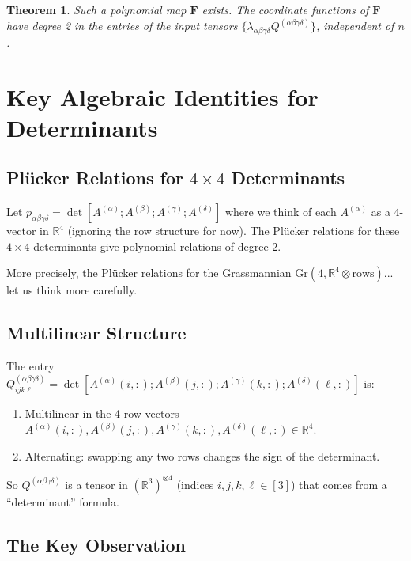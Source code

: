\documentclass[12pt]{article}
\newtheorem{theorem}{Theorem}
\theoremstyle{definition}
\begin{document}
\begin{theorem}\label{thm:main}
Such a polynomial map $\mathbf{F}$ exists. The coordinate functions of $\mathbf{F}$ have degree 2 in the entries of the input tensors $\{\lambda_{\alpha\beta\gamma\delta}Q^{(\alpha\beta\gamma\delta)}\}$, independent of $n$.
\end{theorem}

\section{Key Algebraic Identities for Determinants}

\subsection{Plücker Relations for $4\times 4$ Determinants}

Let $p_{\alpha\beta\gamma\delta} = \det[A^{(\alpha)};A^{(\beta)};A^{(\gamma)};A^{(\delta)}]$ where we think of each $A^{(\alpha)}$ as a $4$-vector in $\mathbb{R}^4$ (ignoring the row structure for now). The Plücker relations for these $4\times 4$ determinants give polynomial relations of degree 2.

More precisely, the Plücker relations for the Grassmannian $\mathrm{Gr}(4,\mathbb{R}^4\otimes\text{rows})$... let us think more carefully.

\subsection{Multilinear Structure}

The entry $Q^{(\alpha\beta\gamma\delta)}_{ijk\ell} = \det[A^{(\alpha)}(i,:);A^{(\beta)}(j,:);A^{(\gamma)}(k,:);A^{(\delta)}(\ell,:)]$ is:
\begin{enumerate}
\item Multilinear in the 4-row-vectors $A^{(\alpha)}(i,:), A^{(\beta)}(j,:), A^{(\gamma)}(k,:), A^{(\delta)}(\ell,:)\in\mathbb{R}^4$.
\item Alternating: swapping any two rows changes the sign of the determinant.
\end{enumerate}

So $Q^{(\alpha\beta\gamma\delta)}$ is a tensor in $(\mathbb{R}^3)^{\otimes 4}$ (indices $i,j,k,\ell\in[3]$) that comes from a ``determinant'' formula.

\subsection{The Key Observation}
\end{document}
